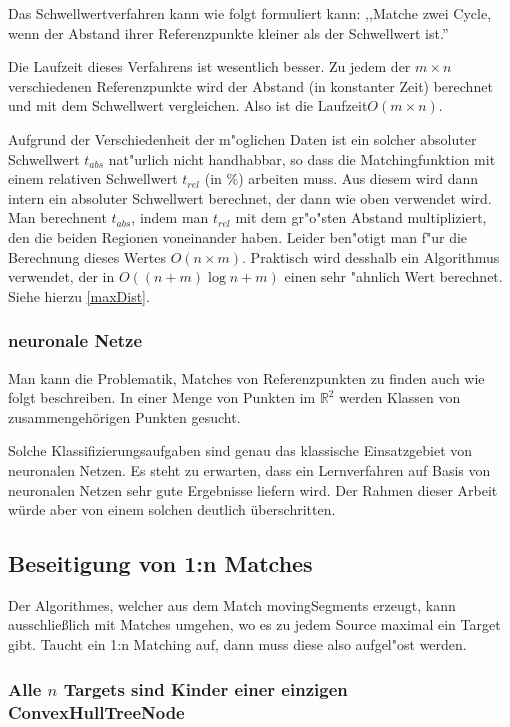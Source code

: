 Das Schwellwertverfahren kann wie folgt formuliert kann: ,,Matche zwei Cycle, wenn der Abstand ihrer Referenzpunkte kleiner als der Schwellwert ist.''

Die Laufzeit dieses Verfahrens ist wesentlich besser. Zu jedem der $m\times n$ verschiedenen  Referenzpunkte wird der  Abstand (in konstanter Zeit) berechnet und mit dem Schwellwert vergleichen. Also ist die Laufzeit$O(m\times n)$.

Aufgrund der Verschiedenheit der m"oglichen Daten ist ein solcher absoluter Schwellwert $t_{abs}$ nat"urlich nicht handhabbar, so dass die Matchingfunktion mit einem relativen Schwellwert $t_{rel}$ (in \%) arbeiten muss. Aus diesem wird dann intern ein absoluter Schwellwert berechnet, der dann wie oben verwendet wird. Man berechnent $t_{abs}$, indem man $t_{rel}$ mit dem gr"o"sten Abstand multipliziert, den die beiden Regionen voneinander haben. Leider ben"otigt man f"ur die Berechnung dieses Wertes $O(n\times m)$. Praktisch wird desshalb ein Algorithmus verwendet, der in $O((n+m)\log{n+m})$ einen sehr "ahnlich Wert berechnet. Siehe hierzu \ref{maxDist}.

\subsubsection*{neuronale Netze}

Man kann die Problematik, Matches von Referenzpunkten zu finden auch wie folgt beschreiben. In einer Menge von Punkten im $\mathbb{R}^2$ werden Klassen von zusammengehörigen Punkten gesucht.

Solche Klassifizierungsaufgaben sind genau das klassische Einsatzgebiet von neuronalen Netzen. Es steht zu erwarten, dass ein Lernverfahren auf Basis von neuronalen Netzen sehr gute Ergebnisse liefern wird. Der Rahmen dieser Arbeit würde aber von einem solchen deutlich überschritten.

\subsection{Beseitigung von 1:n Matches}\label{1zuN}

Der Algorithmes, welcher aus dem Match movingSegments erzeugt, kann ausschließlich mit Matches umgehen, wo es zu jedem Source maximal ein Target gibt. Taucht ein 1:n Matching auf, dann muss diese also aufgel"ost werden. 

\subsubsection*{Alle $n$ Targets sind Kinder einer einzigen ConvexHullTreeNode}

